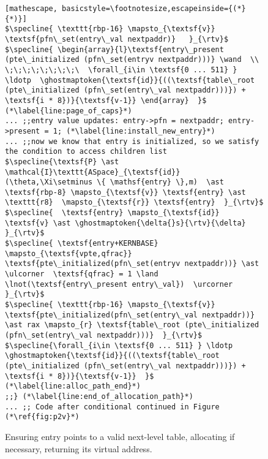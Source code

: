 \begin{figure}
\begin{lstlisting}[mathescape, basicstyle=\footnotesize,escapeinside={(*}{*)}]
$\specline{ \texttt{rbp-16} \mapsto_{\textsf{v}} \textsf{pfn\_set(entry\_val nextpaddr)}   }_{\rtv}$
$\specline{ \begin{array}{l}\textsf{entry\_present (pte\_initialized (pfn\_set(entryv nextpaddr)))} \wand  \\ \;\;\;\;\;\;\;\;\  \forall_{i\in \textsf{0 ... 511} } \ldotp  \ghostmaptoken{\textsf{id}}{((\textsf{table\_root (pte\_initialized (pfn\_set(entry\_val nextpaddr)))}) + \textsf{i * 8})}{\textsf{v-1}} \end{array}  }$ (*\label{line:page_of_caps}*)
... ;;entry value updates: entry->pfn = nextpaddr; entry->present = 1; (*\label{line:install_new_entry}*)
... ;;now we know that entry is initialized, so we satisfy the condition to access children list
$\specline{\textsf{P} \ast \mathcal{I}\texttt{ASpace}_{\textsf{id}}(\theta,\Xi\setminus \{ \mathsf{entry} \},m)  \ast \textsf{rbp-8} \mapsto_{\textsf{v}} \textsf{entry} \ast \texttt{r8}  \mapsto_{\textsf{r}} \textsf{entry}  }_{\rtv}$
$\specline{  \textsf{entry} \mapsto_{\textsf{id}} \textsf{v} \ast \ghostmaptoken{\delta{}s}{\rtv}{\delta} }_{\rtv}$
$\specline{ \textsf{entry+KERNBASE} \mapsto_{\textsf{vpte,qfrac}}  \textsf{pte\_initialized(pfn\_set(entryv nextpaddr))} \ast \ulcorner  \textsf{qfrac} = 1 \land \lnot(\textsf{entry\_present entry\_val})  \urcorner }_{\rtv}$
$\specline{ \texttt{rbp-16} \mapsto_{\textsf{v}} \textsf{pte\_initialized(pfn\_set(entry\_val nextpaddr))}  \ast rax \mapsto_{r} \textsf{table\_root (pte\_initialized (pfn\_set(entry\_val nextpaddr)))}  }_{\rtv}$
$\specline{\forall_{i\in \textsf{0 ... 511} } \ldotp  \ghostmaptoken{\textsf{id}}{((\textsf{table\_root (pte\_initialized (pfn\_set(entry\_val nextpaddr)))}) + \textsf{i * 8})}{\textsf{v-1}}  }$ (*\label{line:alloc_path_end}*)
;;} (*\label{line:end_of_allocation_path}*)
... ;; Code after conditional continued in Figure (*\ref{fig:p2v}*)
\end{lstlisting}
\fi
\vspace{-1em}
\caption{Ensuring \textsf{entry} points to a valid next-level table, allocating if necessary, returning its virtual address.}
\label{fig:calltopteinitializeC}
\vspace{-1em}
\end{figure}


